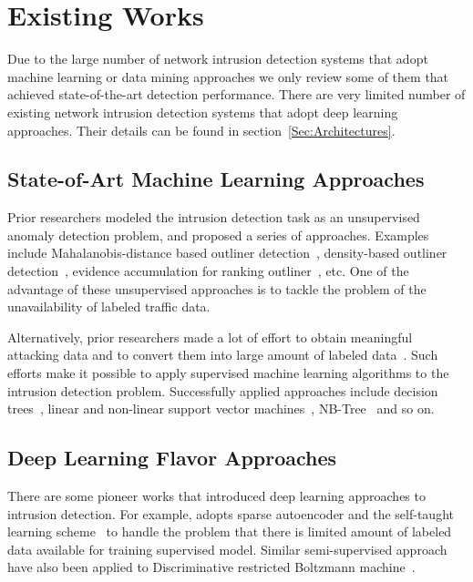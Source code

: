 \section{Existing Works}
Due to the large number of network intrusion detection systems that adopt machine learning or data mining approaches
we only review some of them that achieved state-of-the-art detection performance.
There are very limited number of existing network intrusion detection systems that adopt
deep learning approaches.
Their details can be found in section~\ref{Sec:Architectures}.

\subsection{State-of-Art Machine Learning Approaches}
Prior researchers modeled the intrusion detection task as an unsupervised
anomaly detection problem, and proposed a series of approaches.
Examples include Mahalanobis-distance based outliner detection~\cite{ComparativeAnomalyNIDS},
density-based outliner detection~\cite{LOF, ComparativeAnomalyNIDS},
evidence accumulation for ranking outliner~\cite{RankingOutliner}, etc.
One of the advantage of these unsupervised approaches is to tackle the problem of
the unavailability of labeled traffic data.

Alternatively, prior researchers made a lot of effort to obtain meaningful
attacking data and to convert them into large amount of labeled data~\cite{DARPA, KDDCup, NSL-KDD}.
Such efforts make it possible to apply supervised machine learning algorithms to the
intrusion detection problem.
Successfully applied approaches include decision trees~\cite{DecisionTree},
linear and non-linear support vector machines~\cite{SVM}, NB-Tree~\cite{NB-Tree} and so on.

\subsection{Deep Learning Flavor Approaches}
There are some pioneer works that introduced deep learning approaches to intrusion detection.
For example, \cite{STL-NIDS} adopts sparse autoencoder and the self-taught learning
scheme~\cite{SparseAE} to handle the problem that there is limited amount of labeled data
available for training supervised model.
Similar semi-supervised approach have also been applied to
Discriminative restricted Boltzmann machine~\cite{AnomalyDetectionRBM}.

